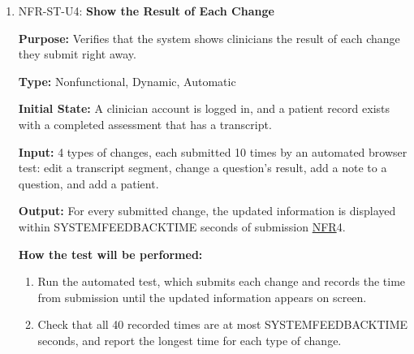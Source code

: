 \documentclass[12pt, titlepage]{article}
\newcommand{\srsnfr}[1]{\href{https://github.com/Nour-Fawaz/MacaBoca/blob/main/pdfs/SRS/SRS.pdf}{NFR}}
\renewcommand{\_}{\oldunderscore\allowbreak}
\begin{document}
\begin{enumerate}
  \item NFR-ST-U4: \textbf{Show the Result of Each Change\\}
  \begin{mdframed}[linewidth=0.5mm]
      \textbf{Purpose:} Verifies that the system shows clinicians the result of each change they submit right away. \par
      \textbf{Type:} Nonfunctional, Dynamic, Automatic \par
      \textbf{Initial State:} A clinician account is logged in, and a patient record exists with a completed assessment that has a transcript. \par
      \textbf{Input:} 4 types of changes, each submitted 10 times by an automated browser test: edit a transcript segment, change a question's result, add a note to a question, and add a patient. \par
      \textbf{Output:} For every submitted change, the updated information is displayed within SYSTEM\_FEEDBACK\_TIME seconds of submission \srsnfr*{4}. \par
      \textbf{How the test will be performed:}
      \begin{enumerate}
        \item[1.] Run the automated test, which submits each change and records the time from submission until the updated information appears on screen.
        \item[2.] Check that all 40 recorded times are at most SYSTEM\_FEEDBACK\_TIME seconds, and report the longest time for each type of change.
      \end{enumerate}
  \end{mdframed}
\end{enumerate}
\end{document}
